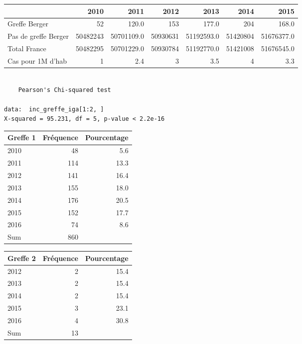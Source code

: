 \documentclass[11pt,a4paper]{article}\usepackage[]{graphicx}\usepackage[]{color}
\makeatletter
\newenvironment{kframe}{%
 \def\at@end@of@kframe{}%
 \ifinner\ifhmode%
  \def\at@end@of@kframe{\end{minipage}}%
  \begin{minipage}{\columnwidth}%
 \fi\fi%
 \def\FrameCommand##1{\hskip\@totalleftmargin \hskip-\fboxsep
 \colorbox{shadecolor}{##1}\hskip-\fboxsep
     \hskip-\linewidth \hskip-\@totalleftmargin \hskip\columnwidth}%
 \MakeFramed {\advance\hsize-\width
   \@totalleftmargin\z@ \linewidth\hsize
   \@setminipage}}%
 {\par\unskip\endMakeFramed%
 \at@end@of@kframe}
\newenvironment{knitrout}{}{} %
\makeatother
\begin{document}
\begin{table}[H]
\centering
\begin{tabular}{lrrrrrr}
  \hline
 & 2010 & 2011 & 2012 & 2013 & 2014 & 2015 \\ 
  \hline
Greffe Berger & 52 & 120.0 & 153 & 177.0 & 204 & 168.0 \\ 
  Pas de greffe Berger & 50482243 & 50701109.0 & 50930631 & 51192593.0 & 51420804 & 51676377.0 \\ 
  Total France & 50482295 & 50701229.0 & 50930784 & 51192770.0 & 51421008 & 51676545.0 \\ 
  Cas pour 1M d'hab &  1 & 2.4 &  3 & 3.5 &  4 & 3.3 \\ 
   \hline
\end{tabular}
\end{table}


\begin{knitrout}
\color{fgcolor}\begin{kframe}
\begin{verbatim}

	Pearson's Chi-squared test

data:  inc_greffe_iga[1:2, ]
X-squared = 95.231, df = 5, p-value < 2.2e-16
\end{verbatim}
\end{kframe}
\end{knitrout}


\begin{table}[H]
\centering
\begin{tabular}{lrr}
  \hline
Greffe 1 & Fréquence & Pourcentage \\ 
  \hline
2010 & 48 & 5.6 \\ 
  2011 & 114 & 13.3 \\ 
  2012 & 141 & 16.4 \\ 
  2013 & 155 & 18.0 \\ 
  2014 & 176 & 20.5 \\ 
  2015 & 152 & 17.7 \\ 
  2016 & 74 & 8.6 \\ 
  Sum & 860 &  \\ 
   \hline
\end{tabular}
\end{table}
\begin{table}[H]
\centering
\begin{tabular}{lrr}
  \hline
Greffe 2 & Fréquence & Pourcentage \\ 
  \hline
2012 &  2 & 15.4 \\ 
  2013 &  2 & 15.4 \\ 
  2014 &  2 & 15.4 \\ 
  2015 &  3 & 23.1 \\ 
  2016 &  4 & 30.8 \\ 
  Sum & 13 &  \\ 
   \hline
\end{tabular}
\end{table}
\end{document}
